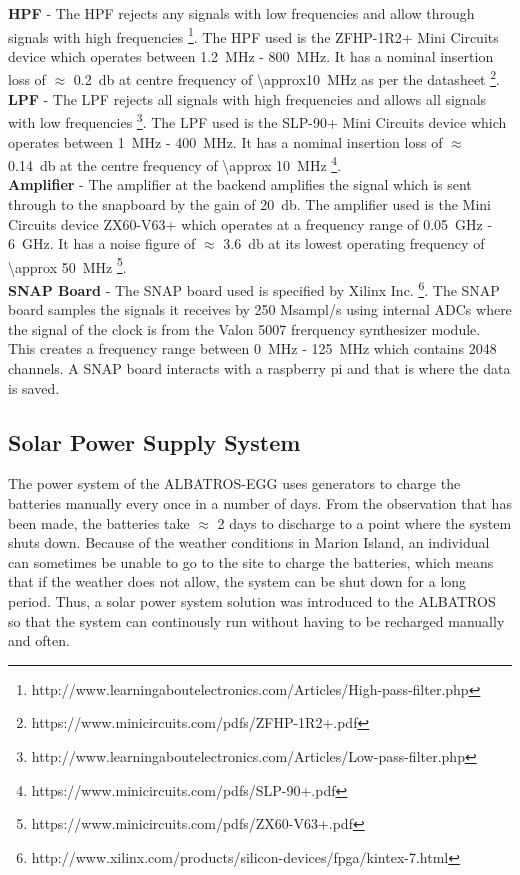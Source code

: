 \documentclass{ws-jai}
\begin{document}
\textbf{HPF} - The HPF rejects any signals with low frequencies and allow through signals with high frequencies \footnote{http://www.learningaboutelectronics.com/Articles/High-pass-filter.php}. The HPF used is the ZFHP-1R2+ Mini Circuits device which operates between  \SI{1.2}{MHz} - \SI{800}{MHz}. It has a nominal insertion loss of $\approx$ \SI{0.2}{\decibel} at centre frequency of  \SI{\approx10}{MHz} as per the datasheet \footnote{https://www.minicircuits.com/pdfs/ZFHP-1R2+.pdf}.\\

\textbf{LPF} - The LPF rejects all signals with high frequencies and allows all signals with low frequencies \footnote{http://www.learningaboutelectronics.com/Articles/Low-pass-filter.php}. The LPF used is the SLP-90+ Mini Circuits device which operates between \SI{1}{MHz} - \SI{400}{MHz}. It has a nominal insertion loss of $\approx$ \SI{0.14}{\decibel} at the centre frequency of  \SI{\approx 10}{MHz} \footnote{https://www.minicircuits.com/pdfs/SLP-90+.pdf}.\\

\textbf{Amplifier} - The amplifier at the backend amplifies the signal which is sent through to the snapboard by the gain of \SI{+20}{\decibel}. The amplifier used is the Mini Circuits device ZX60-V63+ which operates at a frequency range of \SI{0.05}{GHz} - \SI{6}{GHz}. It has a noise figure of $\approx$ \SI{3.6}{\decibel} at its lowest operating frequency of \SI{\approx 50}{MHz} \footnote{https://www.minicircuits.com/pdfs/ZX60-V63+.pdf}.\\

\textbf{SNAP Board} - The SNAP board used is specified by Xilinx Inc. \footnote{http://www.xilinx.com/products/silicon-devices/fpga/kintex-7.html}. The  SNAP board samples the signals it receives by 250 Msampl/s using internal ADCs where the signal of the clock is from the Valon 5007 frerquency synthesizer module. This creates a frequency range between \SI{0}{MHz} - \SI{125}{MHz} which contains 2048 channels. A SNAP board interacts with a raspberry pi and that is where the data is saved.\\

\subsection{Solar Power Supply System}
The power system of the ALBATROS-EGG uses generators to charge the batteries manually every once in a number of days. From the observation that has been made, the batteries take $\approx$ 2 days to discharge to a point where the system shuts down. Because of the weather conditions in Marion Island, an individual can sometimes be unable to go to the site to charge the batteries, which means that if the weather does not allow, the system can be shut down for a long period. Thus, a solar power system solution was introduced to the ALBATROS so that the system can continously run without having to be recharged manually and often.\\
\end{document}
